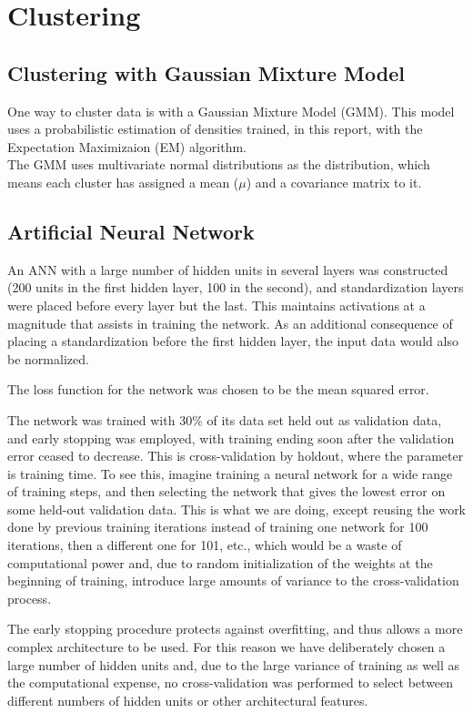 \section{Clustering}


\subsection{Clustering with Gaussian Mixture Model}
One way to cluster data is with a Gaussian Mixture Model (GMM). This model uses a
probabilistic estimation of densities trained, in this report, with the
Expectation Maximizaion (EM) algorithm.\\
The GMM uses multivariate normal distributions as the distribution, which means
each cluster has assigned a mean ($\mu$) and a covariance matrix to it. 
\subsection{Artificial Neural Network}
An ANN with a large number of hidden units in several layers was constructed
(200 units in the first hidden layer, 100 in the second),
and standardization layers were placed before every layer but the last.
This maintains activations at a magnitude that assists in training the network.
As an additional consequence of placing a standardization before the first hidden layer,
the input data would also be normalized.

The loss function for the network was chosen to be the mean squared error.

The network was trained with 30\% of its data set held out as validation data,
and early stopping was employed, with training ending soon after the validation error
ceased to decrease.
This is cross-validation by holdout,
where the parameter is training time.
To see this,
imagine training a neural network for a wide range of training steps,
and then selecting the network that gives the lowest error
on some held-out validation data.
This is what we are doing,
except reusing the work done by previous training iterations
instead of training one network for 100 iterations,
then a different one for 101, etc.,
which would be a waste of computational power
and, due to random initialization of the weights at the beginning of training,
introduce large amounts of variance to the cross-validation process.

The early stopping procedure protects against overfitting,
and thus allows a more complex architecture to be used.
For this reason we have deliberately chosen a large number of hidden units
and, due to the large variance of training as well as the computational expense,
no cross-validation was performed to select between different numbers of hidden units
or other architectural features.

